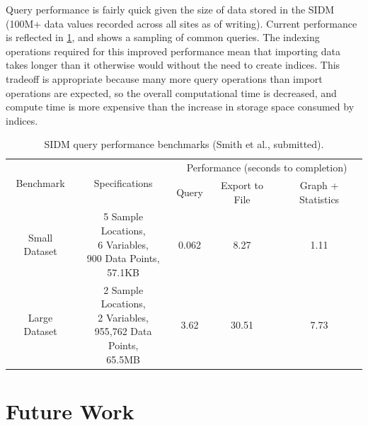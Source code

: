 Query performance is fairly quick given the size of data stored in the SIDM (100M+ data values recorded across all sites as of writing).
Current performance is reflected in \ref{table:query-performance}, and shows a sampling of common queries.
The indexing operations required for this improved performance mean that importing data takes longer than it otherwise would without the need to create indices.
This tradeoff is appropriate because many more query operations than import operations are expected, so the overall computational time is decreased, and compute time is more expensive than the increase in storage space consumed by indices.

\begin{table}[ht!]
\centering
\caption[SIDM query performance benchmarks.]{SIDM query performance benchmarks (Smith et al., submitted).}
	\begin{tabular}{| c | c | c | c | c |}
		\hline
		\multirow{2}{*}{Benchmark} & \multirow{2}{*}{Specifications} & \multicolumn{3}{c}{Performance (seconds to completion)} \vline \\ \cline{3-5}
		& & Query & Export to File & Graph + Statistics \\ \hline
		Small Dataset & \makecell{5 Sample Locations, \\ 6 Variables, \\ 900 Data Points, \\ 57.1KB } & 0.062 & 8.27  & 1.11 \\ \hline
		Large Dataset & \makecell{2 Sample Locations, \\ 2 Variables, \\ 955,762 Data Points, \\ 65.5MB } & 3.62 & 30.51 & 7.73 \\ \hline
	\end{tabular}
	\label{table:query-performance}
\end{table}

\section{Future Work}


